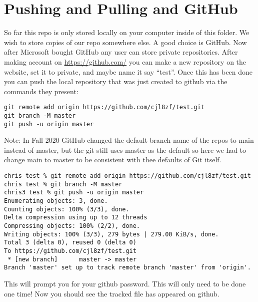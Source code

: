 \documentclass{article}
\begin{document}
\section{Pushing and Pulling and GitHub}
So far this repo is only stored locally on your computer inside of
this folder. We wish to store copies of our repo somewhere else. A
good choice is GitHub. Now after Microsoft bought GitHub any user can
store private repositories. After making account on
\href{https://github.com/}{https://github.com/} you can make a new
repository on the website, set it to private, and maybe name it say
``test''. Once this has been done you can push the local repository
that was just created to github via the commands they present:
\begin{lstlisting}
git remote add origin https://github.com/cjl8zf/test.git
git branch -M master
git push -u origin master
\end{lstlisting}
Note: In Fall 2020 GitHub changed the default branch name of the repos
to main instead of master, but the git still uses master as the
default so here we had to change main to master to be consistent with
thee defaults of Git itself.
\begin{lstlisting}
chris test % git remote add origin https://github.com/cjl8zf/test.git 
chris test % git branch -M master
chris3 test % git push -u origin master 
Enumerating objects: 3, done.
Counting objects: 100% (3/3), done.
Delta compression using up to 12 threads
Compressing objects: 100% (2/2), done.
Writing objects: 100% (3/3), 279 bytes | 279.00 KiB/s, done.
Total 3 (delta 0), reused 0 (delta 0)
To https://github.com/cjl8zf/test.git
 * [new branch]      master -> master
Branch 'master' set up to track remote branch 'master' from 'origin'.
\end{lstlisting}
This will prompt you for your github password. This will only need to
be done one time! Now you should see the tracked file has appeared on github.
\end{document}
